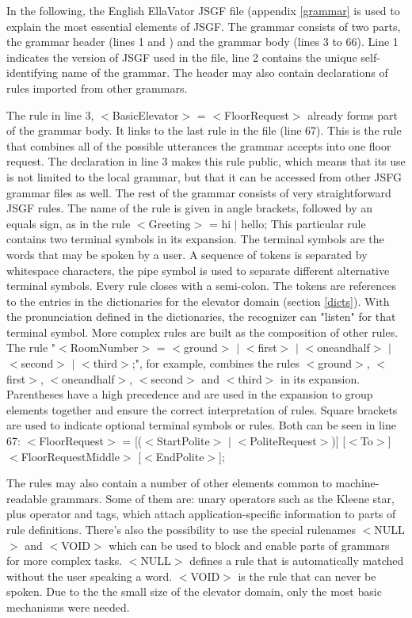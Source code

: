 \documentclass[a4paper, 12pt]{article}
\begin{document}
In the following, the English EllaVator JSGF file (appendix \ref{grammar} is used to explain the most essential elements of JSGF.
The grammar consists of two parts, the grammar header (lines 1 and ) and the grammar body (lines 3 to 66). 
Line 1 indicates the version of JSGF used in the file, line 2 contains the unique self-identifying name of the grammar.
The header may also contain declarations of rules imported from other grammars. 


The rule in line 3, $<$BasicElevator$>$ = $<$FloorRequest$>$ already forms part of the grammar body.
It links to the last rule in the file (line 67).
This is the rule that combines all of the possible utterances the grammar accepts into one floor request. 
The declaration in line 3 makes this rule public, which means that its use is not limited to the local grammar, but that it can be accessed from other JSFG grammar files as well. 
The rest of the grammar consists of very straightforward JSGF rules. 
The name of the rule is given in angle brackets, followed by an equals sign, as in the rule $<$Greeting$>$ = hi $|$ hello; 
This particular rule contains two terminal symbols in its expansion. 
The terminal symbols are the words that may be spoken by a user. 
A sequence of tokens is separated by whitespace characters, the pipe symbol is used to separate different alternative terminal symbols.  
Every rule closes with a semi-colon.
The tokens are references to the entries in the dictionaries for the elevator domain (section \ref{dicts}). 
With the pronunciation defined in the dictionaries, the recognizer can "listen" for that terminal symbol.
More complex rules are built as the composition of other rules. 
The rule "$<$RoomNumber$>$ = $<$ground$>$ $|$ $<$first$>$ $|$ $<$oneandhalf$>$ $|$ $<$second$>$ $|$ $<$third$>$;", for example, combines the rules $<$ground$>$, $<$first$>$, $<$oneandhalf$>$, $<$second$>$ and  $<$third$>$ in its expansion.
 Parentheses have a high precedence and  are used in the expansion to group elements together and ensure the correct interpretation of rules. 
Square brackets are used to indicate optional terminal symbols or rules. 
Both can be seen in line 67: $<$FloorRequest$>$ =  [($<$StartPolite$>$ $|$ $<$PoliteRequest$>$)]  [$<$To$>$] $<$FloorRequestMiddle$>$ [$<$EndPolite$>$];


The rules may also contain a number of other elements common to machine-readable grammars. 
Some of them are: unary operators such as the Kleene star, plus operator and tags, which attach application-specific information to parts of rule definitions. 
There's also the possibility to use the special rulenames $<$NULL$>$ and $<$VOID$>$ which can be used to block and enable parts of grammars for more complex tasks.
$<$NULL$>$ defines a rule that is automatically matched without the user speaking a word. 
$<$VOID$>$ is the rule that can never be spoken.
Due to the the small size of the elevator domain, only the most basic mechanisms were needed. 
\end{document}
